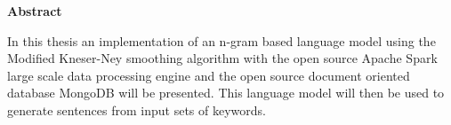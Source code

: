 \thispagestyle{empty}
\begin{center}
    
    \vspace{0.9cm}
    \large
    \textbf{Abstract}

\end{center}
\begin{center}
\vspace{0.3cm}
\large
\vspace{0.4cm}
     
In this thesis an implementation of an n-gram based language model using the Modified Kneser-Ney smoothing algorithm with the open source Apache Spark large scale data processing engine and the open source document oriented database MongoDB will be presented. This language model will then be used to generate sentences from input sets of keywords.
     

\end{center}